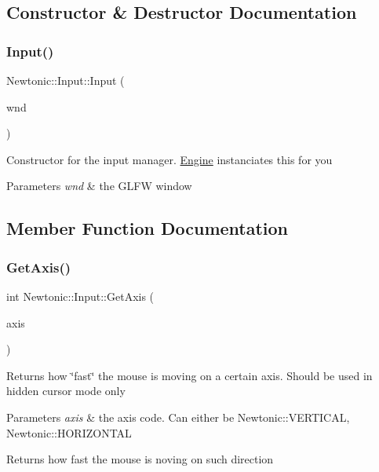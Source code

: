 \subsection{Constructor \& Destructor Documentation}
\mbox{\label{classNewtonic_1_1Input_a5342c596700be9d4fe9b392cf2d416b7}} 
\subsubsection{\texorpdfstring{Input()}{Input()}}
{\footnotesize\ttfamily Newtonic\+::\+Input\+::\+Input (\begin{DoxyParamCaption}\item[{G\+L\+F\+Wwindow $\ast$}]{wnd }\end{DoxyParamCaption})}

Constructor for the input manager. \mbox{\hyperlink{classNewtonic_1_1Engine}{Engine}} instanciates this for you 
\begin{DoxyParams}{Parameters}
{\em wnd} & the G\+L\+FW window \\
\hline
\end{DoxyParams}


\subsection{Member Function Documentation}
\mbox{\label{classNewtonic_1_1Input_a17f37f19abb62bded208634e1b616e22}} 
\subsubsection{\texorpdfstring{GetAxis()}{GetAxis()}}
{\footnotesize\ttfamily int Newtonic\+::\+Input\+::\+Get\+Axis (\begin{DoxyParamCaption}\item[{Mouse\+Axis}]{axis }\end{DoxyParamCaption})\hspace{0.3cm}{\ttfamily [inline]}}

Returns how \char`\"{}fast\char`\"{} the mouse is moving on a certain axis. Should be used in hidden cursor mode only 
\begin{DoxyParams}{Parameters}
{\em axis} & the axis code. Can either be Newtonic\+::\+V\+E\+R\+T\+I\+C\+AL, Newtonic\+::\+H\+O\+R\+I\+Z\+O\+N\+T\+AL \\
\hline
\end{DoxyParams}
\begin{DoxyReturn}{Returns}
how fast the mouse is noving on such direction 
\end{DoxyReturn}
\mbox{\label{classNewtonic_1_1Input_a9543a9322b8adcfd7ee3ecc7c6d67005}} 
